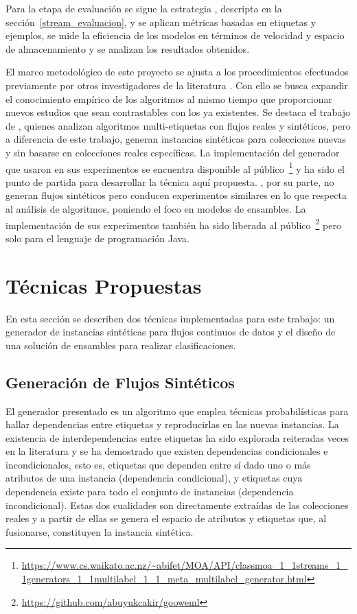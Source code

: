 Para la etapa de evaluación se sigue la estrategia
, descripta en la
sección~\ref{stream_evaluacion}, y se aplican métricas basadas en etiquetas y
ejemplos, se mide la eficiencia de los modelos en términos de velocidad y
espacio de almacenamiento y se analizan los resultados obtenidos.

El marco metodológico de este proyecto se ajusta a los procedimientos efectuados
previamente por otros investigadores de la literatura
\cite{osojnik_multi-label_2017, sousa_multi-label_2018, buyukcakir_novel_2018,
	zheng_survey_2020, read_scalable_2012}. Con ello se busca expandir el
conocimiento empírico de los algoritmos al mismo tiempo que proporcionar nuevos
estudios que sean contrastables con los ya existentes.  Se destaca el trabajo de
\citeauthor{read_scalable_2012} \cite{read_scalable_2012}, quienes analizan
algoritmos multi-etiquetas con flujos reales y sintéticos, pero a diferencia de
este trabajo, generan instancias sintéticas para colecciones nuevas y sin
basarse en colecciones reales específicas. La implementación del generador que
usaron en sus experimentos se encuentra disponible al
público~\footnote{\url{https://www.cs.waikato.ac.nz/~abifet/MOA/API/classmoa_1_1streams_1_1generators_1_1multilabel_1_1_meta_multilabel_generator.html}}
y ha sido el punto de partida para desarrollar la técnica aquí propuesta.
\citeauthor{buyukcakir_novel_2018}, por su parte, no generan flujos sintéticos
pero conducen experimentos similares en lo que respecta al análisis de
algoritmos, poniendo el foco en modelos de ensambles. La implementación de sus
experimentos también ha sido liberada al
público~\footnote{\url{https://github.com/abuyukcakir/gooweml}} pero solo para
el lenguaje de programación Java.


\section{Técnicas Propuestas}

En esta sección se describen dos técnicas implementadas para este trabajo: un
generador de instancias sintéticas para flujos continuos de datos y el diseño de
una solución de ensambles para realizar clasificaciones.

\subsection{Generación de Flujos Sintéticos}

El generador presentado es un algoritmo que emplea técnicas probabilísticas para
hallar dependencias entre etiquetas y reproducirlas en las nuevas instancias. La
existencia de interdependencias entre etiquetas ha sido explorada reiteradas
veces en la literatura \cite{tsoumakas_multi-label_2007, read_multi-label_2008}
y se ha demostrado que existen dependencias condicionales e incondicionales,
esto es, etiquetas que dependen entre sí dado uno o más atributos de una
instancia (dependencia condicional), y etiquetas cuya dependencia existe para
todo el conjunto de instancias (dependencia incondicional). Estas dos cualidades
son directamente extraídas de las colecciones reales y a partir de ellas se
genera el espacio de atributos y etiquetas que, al fusionarse, constituyen la
instancia sintética.

